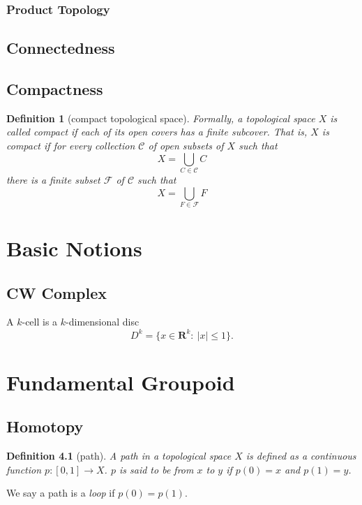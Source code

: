 \documentclass{report}
\newtheorem{definition}{Definition}[section]
\theoremstyle{nonumberplain}
\begin{document}
\subsection{Product Topology}
\section{Connectedness}

\section{Compactness}
\begin{definition}[compact topological space]
	Formally, a topological space $X$ is called \emph{compact} if each of its open covers has a finite subcover. That is, $X$ is compact if for every collection $\mathcal{C}$ of open subsets of $X$ such that
	\[
		X=\bigcup_{C \in \mathcal{C}} C
	\]
	there is a finite subset $\mathcal{F}$ of $\mathcal{C}$ such that
	\[
		X=\bigcup_{F \in \mathcal{F}} F
	\]
\end{definition}

\chapter{Basic Notions}
\section{CW Complex}
A $k$-cell is a $k$-dimensional disc
\[
	D^k=\{x\in\mathbf{R}^k:\ |x|\leq 1\}.
\]

\chapter{Fundamental Groupoid}
\section{Homotopy}
\begin{definition}[path]	
	A \emph{path} in a topological space $X$ is defined as a continuous function $p:[0,1]\to X$. $p$ is said to be from $x$ to $y$ if $p(0)=x$ and $p(1)=y$.
\end{definition}
We say a path is a \emph{loop} if $p(0)=p(1)$.
\end{document}
